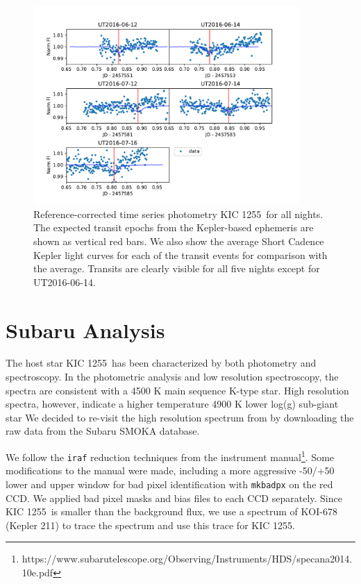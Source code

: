\documentclass[twocolumn]{aastex61}
\newcommand{\shStar}{KIC 1255}
\begin{document}
\begin{figure}
\begin{centering}
\includegraphics[width=0.9\textwidth]{images/all_kic1255_phot/all_kic1255_refcor.pdf}
\caption{Reference-corrected time series photometry \shStar\ for all nights.
The expected transit epochs from the Kepler-based ephemeris \citep{vanWerkhoven2014} are shown as vertical red bars.
We also show the average Short Cadence Kepler light curves for each of the transit events for comparison with the average.
Transits are clearly visible for all five nights except for UT2016-06-14.}\label{fig:allNightrefCorrect}
\end{centering}
\end{figure}

\clearpage

\section{Subaru Analysis}

The host star \shStar\ has been characterized by both photometry and spectroscopy.
In the photometric analysis and low resolution spectroscopy, the spectra are consistent with a 4500 K main sequence K-type star.
High resolution spectra, however, indicate a higher temperature 4900 K lower log(g) sub-giant star \citep{kawahara2013starspots}
We decided to re-visit the high resolution spectrum from \citet{kawahara2013starspots} by downloading the raw data from the Subaru SMOKA database.

We follow the \texttt{iraf} reduction techniques from the instrument manual\footnote{https://www.subarutelescope.org/Observing/Instruments/HDS/specana2014.10e.pdf}.
Some modifications to the manual were made, including a more aggressive -50/+50 lower and upper window for bad pixel identification with \texttt{mkbadpx} on the red CCD.
We applied bad pixel masks and bias files to each CCD separately.
Since \shStar\ is smaller than the background flux, we use a spectrum of KOI-678 (Kepler 211) to trace the spectrum and use this trace for \shStar.
\end{document}
